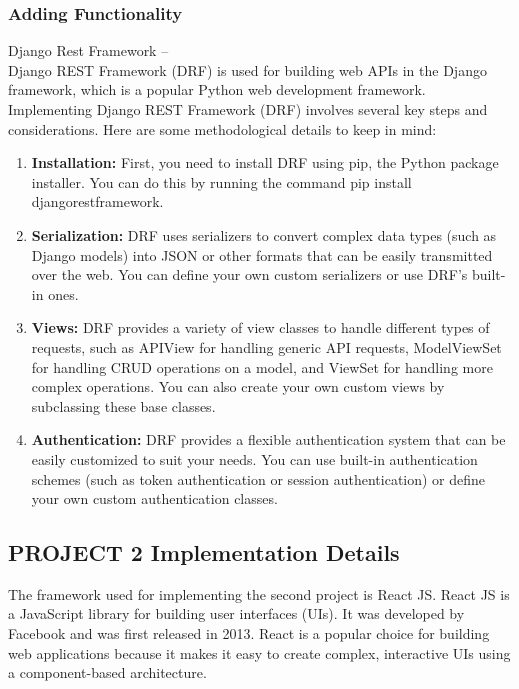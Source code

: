 \documentclass[a4paper, 12pt]{article}
\begin{document}
\subsubsection{Adding Functionality}
\hspace*{10mm}Django Rest Framework – \\
\hspace*{10mm} Django REST Framework (DRF) is used for building web APIs in the Django framework, which is a popular Python web development framework. Implementing Django REST Framework (DRF) involves several key steps and considerations. Here are some methodological details to keep in mind: 
\begin{enumerate}
    \item \textbf{Installation:} First, you need to install DRF using pip, the Python package installer. You can do this by running the command pip install djangorestframework.
    \item \textbf{Serialization:} DRF uses serializers to convert complex data types (such as Django models) into JSON or other formats that can be easily transmitted over the web. You can define your own custom serializers or use DRF's built-in ones.
    \item \textbf{Views:} DRF provides a variety of view classes to handle different types of requests, such as APIView for handling generic API requests, ModelViewSet for handling CRUD operations on a model, and ViewSet for handling more complex operations. You can also create your own custom views by subclassing these base classes.
    \item \textbf{Authentication:} DRF provides a flexible authentication system that can be easily customized to suit your needs. You can use built-in authentication schemes (such as token authentication or session authentication) or define your own custom authentication classes.
\end{enumerate} 
\newpage
\subsection{PROJECT 2 Implementation Details}
\hspace*{10mm} The framework used for implementing the second project is React JS. React JS is a JavaScript library for building user interfaces (UIs). It was developed by Facebook and was first released in 2013. React is a popular choice for building web applications because it makes it easy to create complex, interactive UIs using a component-based architecture.\\
\end{document}
